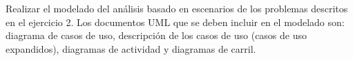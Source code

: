 Realizar el modelado del análisis basado en escenarios de los problemas descritos en el ejercicio 2. Los documentos UML que se deben incluir en el modelado son: diagrama de casos de uso, descripción de los casos de uso (casos de uso expandidos), diagramas de actividad y diagramas de carril.
